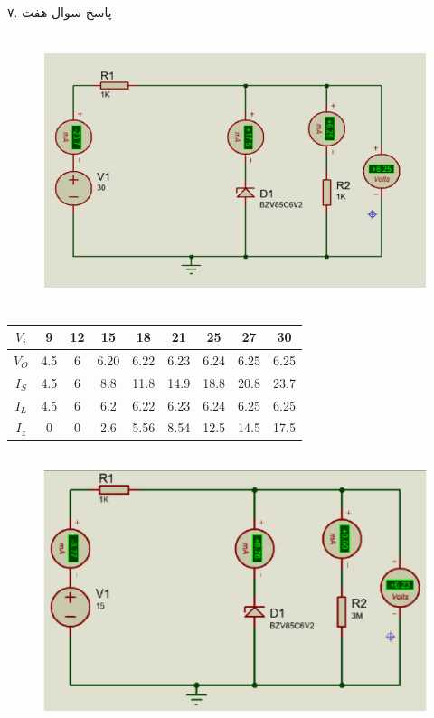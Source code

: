 \documentclass[12pt]{article}
\begin{document}
۷. پاسخ سوال هفت
\begin{figure}[H]
	\begin{center}
		\includegraphics[width=\textwidth, height=8cm]{./images/8.11}
	\end{center}
\end{figure}

\begin{latin}
\begin{table}[H]
\begin{adjustbox}{width=\textwidth}
\begin{tabular}{|c|c|c|c|c|c|c|c|c|}
\hline
$V_i$ & 9 & 12 & 15 & 18 & 21 & 25 & 27 & 30 \\
\hline
\hline
$V_O$ & 4.5 & 6 & 6.20 & 6.22 & 6.23 & 6.24 & 6.25 & 6.25 \\
\hline
$I_S$ & 4.5 & 6 & 8.8 & 11.8 & 14.9 & 18.8 & 20.8 & 23.7 \\
\hline
$I_L$ & 4.5 & 6 & 6.2 & 6.22 & 6.23 & 6.24 & 6.25 & 6.25 \\
\hline
$I_z$ & 0 & 0 & 2.6 & 5.56 & 8.54 & 12.5 & 14.5 & 17.5 \\
\hline
\end{tabular}
\end{adjustbox}
\end{table}
\end{latin}


\begin{figure}[H]
	\begin{center}
		\includegraphics[width=\textwidth, height=8cm]{./images/8.12}
	\end{center}
\end{figure}
\end{document}
